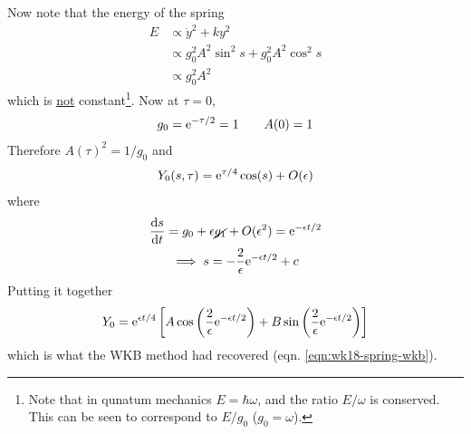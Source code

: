 Now note that the energy of the spring
\begin{align*}
	E &\propto \dot{y}^2 + k y^2 \\
	  &\propto g_0^2 A^2 \sin^2 s + g_0^2A^2 \cos^2 s \\
	  & \propto g_0^2 A^2
\end{align*}
which is \underline{not} constant\footnote{Note that in qunatum mechanics $E = \hbar \omega$, and the ratio $E/\omega$ is conserved. This can be seen to correspond to $E/g_0$ ($g_0 = \omega$).}. Now at $\tau = 0$, 
\begin{gather*}
	g_0 = \mathrm{e}^{-\tau/2} = 1 \qquad A(0) = 1
\end{gather*}
Therefore $A(\tau)^2 = 1/g_0$ and
\begin{gather*}
	Y_0(s,\tau) = \mathrm{e}^{\tau/4} \cos (s) + O(\epsilon)
\end{gather*}
where
\begin{gather*}
	\frac{\mathrm{d} s}{\mathrm{d} t} = g_0 + \epsilon \cancel{g_1} + O(\epsilon^2) = \mathrm{e}^{-\epsilon t/2} \\
	\implies s = -\frac{2}{\epsilon}\mathrm{e}^{-\epsilon t/2} + c
\end{gather*}
Putting it together
\begin{align*}
	Y_0 = \mathrm{e}^{\epsilon t/4}\left[A \cos \left( \frac{2}{\epsilon} \mathrm{e}^{-\epsilon t/2} \right) + B\sin \left( \frac{2}{\epsilon} \mathrm{e}^{-\epsilon t/2} \right)\right]
\end{align*}
which is what the WKB method had recovered (eqn. \ref{eqn:wk18-spring-wkb}).


